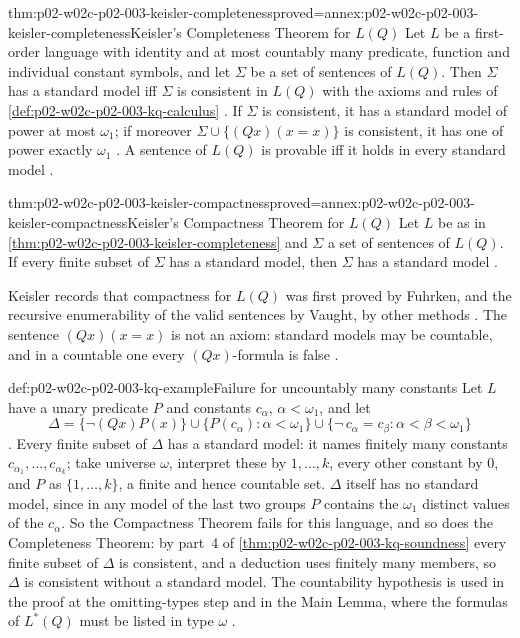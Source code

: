 \begin{hbtheorem}{thm:p02-w02c-p02-003-keisler-completeness}{proved=annex:p02-w02c-p02-003-keisler-completeness}{Keisler's Completeness Theorem for \(L(Q)\)}
Let \(L\) be a first-order language with identity and at most countably
many predicate, function and individual constant symbols, and let
\(\Sigma\) be a set of sentences of \(L(Q)\).  Then \(\Sigma\) has a
standard model iff \(\Sigma\) is consistent in \(L(Q)\) with the axioms and
rules of \cref{def:p02-w02c-p02-003-kq-calculus}
\cite[\S2, p.~13]{Keisler1970}.  If \(\Sigma\) is consistent, it has a
standard model of power at most \(\omega_1\); if moreover
\(\Sigma\cup\{(Qx)(x=x)\}\) is consistent, it has one of power exactly
\(\omega_1\) \cite[\S2, Corollary~2.9, p.~26]{Keisler1970}.  A sentence of
\(L(Q)\) is provable iff it holds in every standard model
\cite[\S2, Corollary~2.10, p.~26]{Keisler1970}.
\end{hbtheorem}

\begin{hbcorollary}{thm:p02-w02c-p02-003-keisler-compactness}{proved=annex:p02-w02c-p02-003-keisler-compactness}{Keisler's Compactness Theorem for \(L(Q)\)}
Let \(L\) be as in \cref{thm:p02-w02c-p02-003-keisler-completeness} and
\(\Sigma\) a set of sentences of \(L(Q)\).  If every finite subset of
\(\Sigma\) has a standard model, then \(\Sigma\) has a standard model
\cite[\S2, Corollary~2.11, p.~27]{Keisler1970}.
\end{hbcorollary}

Keisler records that compactness for \(L(Q)\) was first proved by Fuhrken,
and the recursive enumerability of the valid sentences by Vaught, by other
methods \cite[\S2, p.~27]{Keisler1970}.  The sentence \((Qx)(x=x)\) is not
an axiom: standard models may be countable, and in a countable one every
\((Qx)\)-formula is false \cite[\S1, p.~6]{Keisler1970}.

\begin{hbexample}{def:p02-w02c-p02-003-kq-example}{Failure for uncountably many constants}
Let \(L\) have a unary predicate \(P\) and constants \(c_\alpha\),
\(\alpha<\omega_1\), and let
\[
 \Delta=\{\neg(Qx)P(x)\}\cup\{P(c_\alpha):\alpha<\omega_1\}
        \cup\{\neg\,c_\alpha=c_\beta:\alpha<\beta<\omega_1\}
\]
\cite[\S2, p.~27]{Keisler1970}.  Every finite subset of \(\Delta\) has a
standard model: it names finitely many constants \(c_{\alpha_1},\ldots,
c_{\alpha_k}\); take universe \(\omega\), interpret these by \(1,\ldots,k\),
every other constant by \(0\), and \(P\) as \(\{1,\ldots,k\}\), a finite
and hence countable set.  \(\Delta\) itself has no standard model, since in
any model of the last two groups \(P\) contains the \(\omega_1\) distinct
values of the \(c_\alpha\).  So the Compactness Theorem fails for this
language, and so does the Completeness Theorem: by part~4 of
\cref{thm:p02-w02c-p02-003-kq-soundness} every finite subset of \(\Delta\)
is consistent, and a deduction uses finitely many members, so \(\Delta\) is
consistent without a standard model.  The countability hypothesis is used
in the proof at the omitting-types step and in the Main Lemma, where the
formulas of \(L^{*}(Q)\) must be listed in type \(\omega\)
\cite[\S2, p.~16]{Keisler1970}.
\end{hbexample}

